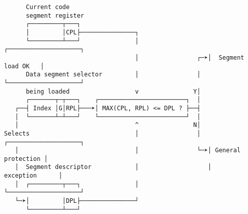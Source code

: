 \documentclass[varwidth=55em]{standalone}
\begin{document}
\begin{verbatim}
      Current code
      segment register
      ┌─────────┬───┐               
      │         │CPL├───────────────┐
      └─────────┴───┘               │                   ┌────────────────────┐
                                    │                ┌─➤│  Segment load OK   │
      Data segment selector         │                │  └────────────────────┘
      being loaded                  v               Y│
      ┌───────┬─┬───┐    ┌────────────────────────┐  │
   ┌──┤ Index │G│RPL├───➤│ MAX(CPL, RPL) <= DPL ? ├──┤
   │  └───────┴─┴───┘    └────────────────────────┘  │
   │                                ^               N│
Selects                             │                │  ┌────────────────────┐
   │                                │                └─➤│ General protection │
   │  Segment descriptor            │                   │     exception      │
   │  ┌─────────┬───┐               │                   └────────────────────┘
   └─➤│         │DPL├───────────────┘
      └─────────┴───┘ 
\end{verbatim}         
\end{document}
